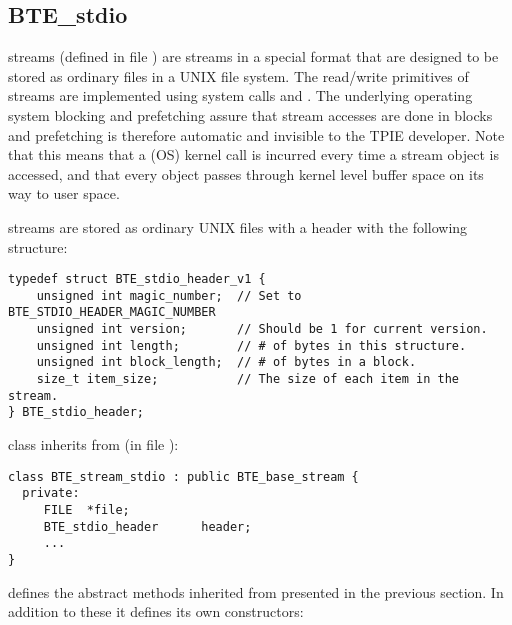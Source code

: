 \subsection{BTE\_stdio}

\tobeextended

 streams (defined in file ) are
streams in a special format that are designed to be stored as ordinary
files in a UNIX file system. The read/write primitives of 
streams are implemented using system calls  and
. The underlying operating system blocking and prefetching
assure that stream accesses are done in blocks and prefetching is therefore
automatic and invisible to the TPIE developer. Note that this means that a
(OS) kernel call is incurred every time a stream object is
accessed, and that every object passes through kernel level buffer space on
its way to user space.


 streams are stored as ordinary UNIX files with a 
header with the following structure:

\begin{verbatim}
typedef struct BTE_stdio_header_v1 { 
    unsigned int magic_number;  // Set to BTE_STDIO_HEADER_MAGIC_NUMBER
    unsigned int version;       // Should be 1 for current version.
    unsigned int length;        // # of bytes in this structure.
    unsigned int block_length;  // # of bytes in a block.
    size_t item_size;           // The size of each item in the stream.
} BTE_stdio_header;
\end{verbatim}

 class inherits from  (in file
):
\begin{verbatim}
class BTE_stream_stdio : public BTE_base_stream {
  private:
     FILE  *file;          
     BTE_stdio_header      header;
     ...
}  
\end{verbatim}

 defines the abstract methods inherited from
 presented in the previous section. In addition to these it defines its own
constructors:

